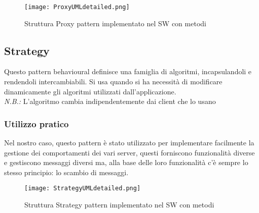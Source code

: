 \begin{figure}[htbp]
    \centering
    \texttt{[image: ProxyUMLdetailed.png]}
    \caption{Struttura Proxy pattern implementato nel SW con metodi}
\end{figure}

\subsection{Strategy}

\noindent Questo pattern behavioural definisce una famiglia di algoritmi, incapsulandoli e rendendoli intercambiabili. Si usa quando si ha necessità di modificare dinamicamente gli algoritmi utilizzati dall’applicazione.\\
\textit{N.B.:} L’algoritmo cambia indipendentemente dai client che lo usano

\subsubsection{Utilizzo pratico}
\noindent Nel nostro caso, questo pattern è stato utilizzato per implementare facilmente la gestione dei  comportamenti dei vari server, questi forniscono funzionalità diverse e gestiscono messaggi diversi ma, alla base delle loro funzionalità c’è sempre lo stesso principio: lo scambio di messaggi.

\begin{figure}[htbp]
    \centering
    \texttt{[image: StrategyUMLdetailed.png]}
    \caption{Struttura Strategy pattern implementato nel SW con metodi}
\end{figure}